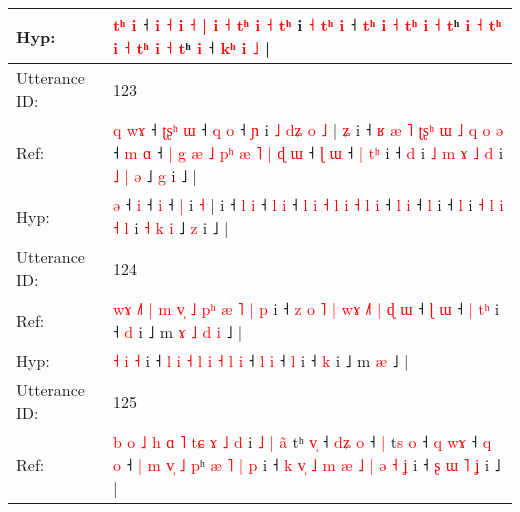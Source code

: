 \documentclass[10pt]{article}
\DeclareRobustCommand{\hl}[1]{{\textcolor{red}{#1}}}
\begin{document}
\begin{longtable}{ll}
 \\
Hyp: & \hl{t}\hl{ʰ} \hl{i} ˧ \hl{i} \hl{˧} \hl{i} \hl{˧} \hl{}\hl{|} \hl{i} \hl{˧} \hl{}\hl{}\hl{t}\hl{ʰ} \hl{i} \hl{˧} \hl{}\hl{t}\hl{ʰ} i \hl{˧} \hl{}\hl{t}\hl{ʰ} \hl{i} ˧\hl{}\hl{} \hl{}\hl{t}\hl{ʰ} \hl{i} \hl{}\hl{˧} \hl{}\hl{t}\hl{ʰ} \hl{}\hl{i} \hl{˧} \hl{}\hl{t}ʰ\hl{}\hl{}\hl{}\hl{} \hl{}\hl{i} \hl{˧} \hl{}\hl{t}\hl{ʰ} \hl{}\hl{i} \hl{}\hl{˧} \hl{}\hl{t}\hl{ʰ} \hl{i} \hl{˧} \hl{t}ʰ \hl{i} ˧\hl{}\hl{}\hl{}\hl{} \hl{}\hl{k}\hl{ʰ} \hl{i} \hl{˩} |
 \\
\midrule
Utterance ID: & 123 \\
Ref: & \hl{q}\hl{ }\hl{w}\hl{ɤ} ˧\hl{ }\hl{ʈ}\hl{ʂ}\hl{ʰ} \hl{ɯ} ˧\hl{ }\hl{q} \hl{o} ˧ \hl{ɲ} i\hl{ }\hl{˩}\hl{ }\hl{d}\hl{ʑ}\hl{ }\hl{o} \hl{˩} |\hl{ }\hl{ʑ} i ˧\hl{ }\hl{ʁ}\hl{ }\hl{æ}\hl{ }\hl{˥}\hl{ }\hl{ʈ}\hl{ʂ}\hl{ʰ}\hl{ }\hl{ɯ}\hl{ }\hl{˩}\hl{ }\hl{q} \hl{o} \hl{ə} ˧ \hl{m} \hl{ɑ} ˧\hl{ }\hl{|}\hl{ }\hl{g} \hl{æ} \hl{˩} \hl{p}\hl{ʰ} \hl{æ} \hl{˥} \hl{|} \hl{ɖ} \hl{ɯ} ˧ \hl{ɭ} \hl{ɯ} ˧\hl{ }\hl{|} \hl{t}\hl{ʰ} i ˧ \hl{d} i \hl{˩} \hl{m} \hl{ɤ} \hl{˩} \hl{d} i \hl{˩} \hl{|} \hl{ə} ˩ \hl{g} i ˩ |
 \\
Hyp: & \hl{}\hl{}\hl{}\hl{ə} ˧\hl{}\hl{}\hl{}\hl{} \hl{i} ˧\hl{}\hl{} \hl{i} ˧ \hl{|} i\hl{}\hl{}\hl{}\hl{}\hl{}\hl{}\hl{} \hl{˧} |\hl{}\hl{} i ˧\hl{}\hl{}\hl{}\hl{}\hl{}\hl{}\hl{}\hl{}\hl{}\hl{}\hl{}\hl{}\hl{}\hl{}\hl{}\hl{} \hl{l} \hl{i} ˧ \hl{l} \hl{i} ˧\hl{}\hl{}\hl{}\hl{} \hl{l} \hl{i} \hl{}\hl{˧} \hl{l} \hl{i} \hl{˧} \hl{l} \hl{i} ˧ \hl{l} \hl{i} ˧\hl{}\hl{} \hl{}\hl{l} i ˧ \hl{l} i \hl{˧} \hl{l} \hl{i} \hl{˧} \hl{l} i \hl{˧} \hl{k} \hl{i} ˩ \hl{z} i ˩ |
 \\
\midrule
Utterance ID: & 124 \\
Ref: & \hl{w}\hl{ɤ}\hl{ }\hl{˩}\hl{˥}\hl{ }\hl{|}\hl{ }\hl{m}\hl{ }\hl{v}\hl{̩}\hl{ }\hl{˩}\hl{ }\hl{p}\hl{ʰ}\hl{ }\hl{æ}\hl{ }\hl{˥} \hl{|} \hl{p} i ˧\hl{ }\hl{z} \hl{o} \hl{˥} \hl{|} \hl{w}\hl{ɤ} \hl{˩}\hl{˥} \hl{|} \hl{ɖ} \hl{ɯ} ˧ \hl{ɭ} \hl{ɯ} ˧\hl{ }\hl{|} \hl{t}\hl{ʰ} i ˧ \hl{d} i ˩ m\hl{ }\hl{ɤ}\hl{ }\hl{˩}\hl{ }\hl{d} \hl{i} ˩ |
 \\
Hyp: & \hl{}\hl{}\hl{}\hl{}\hl{}\hl{}\hl{}\hl{}\hl{}\hl{}\hl{}\hl{}\hl{}\hl{}\hl{}\hl{}\hl{}\hl{}\hl{}\hl{}\hl{˧} \hl{i} \hl{˧} i ˧\hl{}\hl{} \hl{l} \hl{i} \hl{˧} \hl{}\hl{l} \hl{}\hl{i} \hl{˧} \hl{l} \hl{i} ˧ \hl{l} \hl{i} ˧\hl{}\hl{} \hl{}\hl{l} i ˧ \hl{k} i ˩ m\hl{}\hl{}\hl{}\hl{}\hl{}\hl{} \hl{æ} ˩ |
 \\
\midrule
Utterance ID: & 125 \\
Ref: & \hl{b}\hl{ }\hl{o} \hl{˩} \hl{h} \hl{ɑ} \hl{˥} \hl{t}\hl{ɕ} \hl{ɤ} \hl{˩} \hl{d} i\hl{ }\hl{˩}\hl{ }\hl{|} \hl{a}\hl{̃} tʰ \hl{v}\hl{̩} ˧ \hl{d}\hl{ʑ} \hl{o} ˧\hl{ }\hl{|} t\hl{s} \hl{o} ˧ \hl{q}\hl{ }\hl{w}\hl{ɤ} ˧ \hl{}\hl{q} \hl{o} ˧ \hl{|}\hl{ }\hl{m} \hl{v}\hl{̩} \hl{˩} \hl{p}ʰ \hl{æ} \hl{˥} \hl{|}\hl{ }\hl{p} i ˧\hl{ }\hl{k} \hl{v}\hl{̩} \hl{˩} \hl{m} \hl{æ}\hl{ }\hl{˩} \hl{|} \hl{ə} \hl{˧}\hl{ }\hl{ʝ} i ˧ \hl{}\hl{ʂ} \hl{ɯ} \hl{˥} \hl{ʝ} i ˩ |

\end{longtable}
\end{document}
